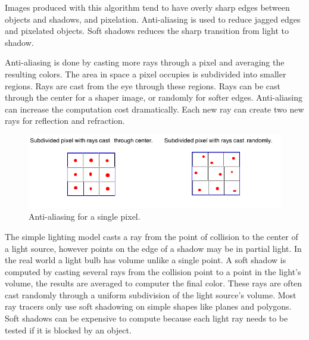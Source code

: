 \documentclass[11pt,a4paper,oneside]{article}
\begin{document}
Images produced with this algorithm tend to have overly sharp edges between objects and shadows, and pixelation.  Anti-aliasing is used to reduce jagged edges and pixelated objects. Soft shadows reduces the sharp transition from light to shadow.

Anti-aliasing is done by casting more rays through a pixel and averaging the resulting colors.  The area in space a pixel occupies is subdivided into smaller regions.  Rays are cast from the eye through these regions.  Rays can be cast through the center for a shaper image, or randomly for softer edges.  Anti-aliasing can increase the computation cost dramatically.  Each new ray can create two new rays for reflection and refraction.

\begin{figure}[H]
\includegraphics[scale=0.6]{aa.png} 
\caption{Anti-aliasing for a single pixel.}
\label{aa}
\end{figure}

 The simple lighting model casts a ray from the point of collision to the center of a light source, however points on the edge of a shadow may be in partial light.  In the real world a light bulb has volume unlike a single point.  A soft shadow is computed by casting several rays from the collision point to a point in the light's volume, the results are averaged to computer the final color.  These rays are often cast randomly through a uniform subdivision of the light source's volume.  Most ray tracers only use soft shadowing on simple shapes like planes and polygons.  Soft shadows can be expensive to compute because each light ray needs to be tested if it is blocked by an object.
\end{document}
